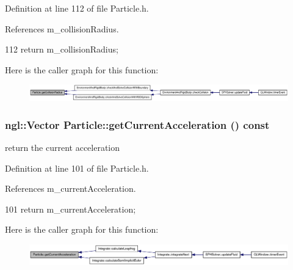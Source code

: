 Definition at line 112 of file Particle.h.



References m\_\-collisionRadius.




\begin{DoxyCode}
112 { return m_collisionRadius; }
\end{DoxyCode}




Here is the caller graph for this function:\nopagebreak
\begin{figure}[H]
\begin{center}
\leavevmode
\includegraphics[width=420pt]{class_particle_aa036d0b56d97a9f56d9c5e3ab9035b9d_icgraph}
\end{center}
\end{figure}


\hypertarget{class_particle_a0c30fc4edf9e8fba9c015cdd0c4d7dc0}{
\subsubsection[{getCurrentAcceleration}]{\setlength{\rightskip}{0pt plus 5cm}ngl::Vector Particle::getCurrentAcceleration () const}}
\label{class_particle_a0c30fc4edf9e8fba9c015cdd0c4d7dc0}


return the current acceleration 



Definition at line 101 of file Particle.h.



References m\_\-currentAcceleration.




\begin{DoxyCode}
101 { return m_currentAcceleration; }
\end{DoxyCode}




Here is the caller graph for this function:\nopagebreak
\begin{figure}[H]
\begin{center}
\leavevmode
\includegraphics[width=420pt]{class_particle_a0c30fc4edf9e8fba9c015cdd0c4d7dc0_icgraph}
\end{center}
\end{figure}


